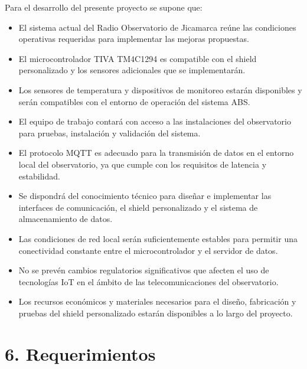 \documentclass[
11pt, %
]{charter}
\begin{document}
Para el desarrollo del presente proyecto se supone que:
\begin{itemize}
	\item El sistema actual del Radio Observatorio de Jicamarca reúne las condiciones operativas requeridas para implementar las mejoras propuestas.

	\item El microcontrolador TIVA TM4C1294 es compatible con el shield personalizado y los sensores adicionales que se implementarán.

	\item Los sensores de temperatura y dispositivos de monitoreo estarán disponibles y serán compatibles con el entorno de operación del sistema ABS.

	\item El equipo de trabajo contará con acceso a las instalaciones del observatorio para pruebas, instalación y validación del sistema.

	\item El protocolo MQTT es adecuado para la transmisión de datos en el entorno local del observatorio, ya que cumple con los requisitos de latencia y estabilidad.

	\item Se dispondrá del conocimiento técnico para diseñar e implementar las interfaces de comunicación, el shield personalizado y el sistema de almacenamiento de datos.

	\item Las condiciones de red local serán suficientemente estables para permitir una conectividad constante entre el microcontrolador y el servidor de datos.

	\item No se prevén cambios regulatorios significativos que afecten el uso de tecnologías IoT en el ámbito de las telecomunicaciones del observatorio.

	\item Los recursos económicos y materiales necesarios para el diseño, fabricación y pruebas del shield personalizado estarán disponibles a lo largo del proyecto.
\end{itemize}

\section{6. Requerimientos}
\label{sec:requerimientos}
\end{document}
